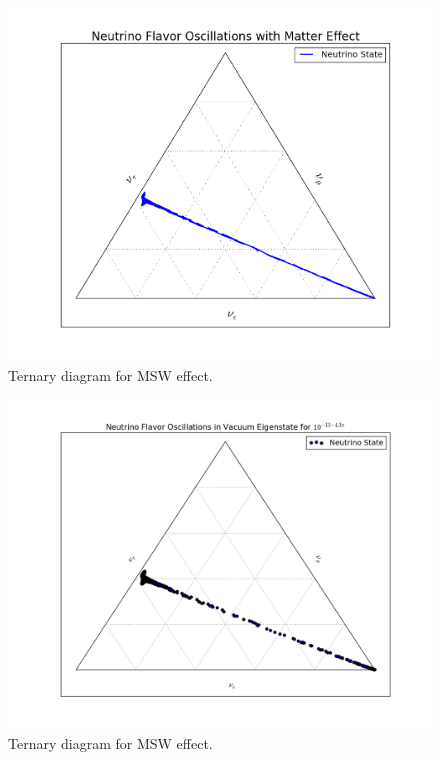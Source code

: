 \documentclass{tufte-handout}
\begin{document}
\begin{figure}
\centering
\includegraphics{assets/ternary/mass-1}
\caption{Ternary diagram for MSW effect.}
\label{fig:ternary-mass-1}
\end{figure}

\begin{figure}
\centering
\includegraphics{assets/ternary/mass-1-scatter.png}
\caption{Ternary diagram for MSW effect.}
\label{fig:ternary-mass-1-scatter}
\end{figure}
\end{document}
